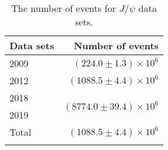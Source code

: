 \begin{table}[hbtp]
	\centering
	\normalsize
	\caption[]{{The number of events for $J/\psi$ data sets. }}
	\label{tab:jpsievent}
\begin{tabular}{lr}
\firsthline
Data sets    & Number of events \\
\hline
	2009 & $(224.0\pm1.3)\times10^6$ \\
	2012 & $(1088.5\pm4.4)\times10^6$ \\
	2018 & \multirow{2}{*}{$(8774.0\pm39.4)\times10^6$} \\
	2019 &  \\
	\hline
	Total & $(1088.5\pm4.4)\times10^6$ \\
\lasthline
\end{tabular}
\end{table}
